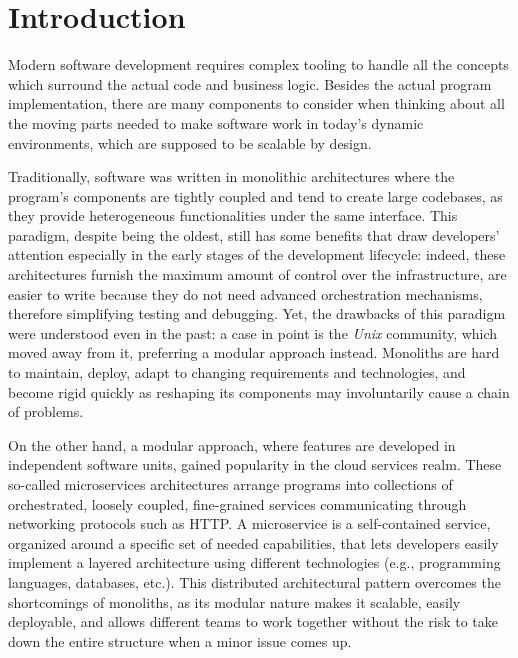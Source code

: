 \chapter{Introduction}
\label{chap:introduction}
Modern software development requires complex tooling to handle
all the concepts which surround the actual code and business logic.
Besides the actual program implementation, there are many components to consider
when thinking about all the moving parts needed to make software work
in today's dynamic environments, which are supposed to be scalable by design.

Traditionally, software was written in monolithic architectures where
the program's components are tightly coupled and tend to create
large codebases, as they provide heterogeneous functionalities under the same interface.
This paradigm, despite being the oldest, still has some benefits that
draw developers' attention especially in the early stages of the development lifecycle:
indeed, these architectures furnish the maximum amount of control over the infrastructure,
are easier to write because they do not need advanced orchestration mechanisms,
therefore simplifying testing and debugging.
Yet, the drawbacks of this paradigm were understood even in the past:
a case in point is the \textit{Unix} community, which moved away from it,
preferring a modular approach instead. Monoliths are hard to maintain, deploy,
adapt to changing requirements and technologies, and
become rigid quickly as reshaping its components may involuntarily cause a chain of problems.

On the other hand, a modular approach, where features are developed in
independent software units, gained popularity in the cloud services realm.
These so-called microservices architectures arrange
programs into collections of orchestrated, loosely coupled, fine-grained services
communicating through networking protocols such as HTTP.
A microservice is a self-contained service, organized around a specific set
of needed capabilities, that lets developers easily implement a layered architecture
using different technologies (e.g., programming languages, databases, etc.).
This distributed architectural pattern overcomes the shortcomings of monoliths,
as its modular nature makes it scalable, easily deployable, and allows different teams
to work together without the risk to take down the entire structure when a minor issue comes up.

